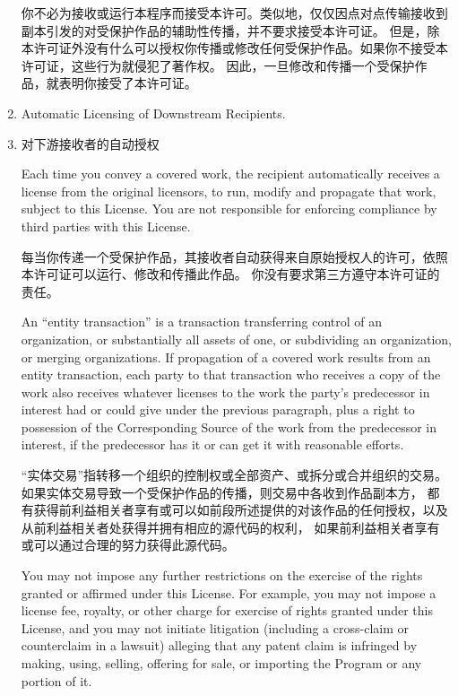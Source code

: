 \documentclass[11pt]{article}
\begin{document}
\begin{enumerate}
        你不必为接收或运行本程序而接受本许可。类似地，仅仅因点对点传输接收到副本引发的对受保护作品的辅助性传播，并不要求接受本许可证。
        但是，除本许可证外没有什么可以授权你传播或修改任何受保护作品。如果你不接受本许可证，这些行为就侵犯了著作权。
        因此，一旦修改和传播一个受保护作品，就表明你接受了本许可证。

  \item Automatic Licensing of Downstream Recipients.
  \item 对下游接收者的自动授权

        Each time you convey a covered work, the recipient automatically
        receives a license from the original licensors, to run, modify and
        propagate that work, subject to this License.  You are not responsible
        for enforcing compliance by third parties with this License.

        每当你传递一个受保护作品，其接收者自动获得来自原始授权人的许可，依照本许可证可以运行、修改和传播此作品。
        你没有要求第三方遵守本许可证的责任。

        An ``entity transaction'' is a transaction transferring control of an
        organization, or substantially all assets of one, or subdividing an
        organization, or merging organizations.  If propagation of a covered
        work results from an entity transaction, each party to that
        transaction who receives a copy of the work also receives whatever
        licenses to the work the party's predecessor in interest had or could
        give under the previous paragraph, plus a right to possession of the
        Corresponding Source of the work from the predecessor in interest, if
        the predecessor has it or can get it with reasonable efforts.

        “实体交易”指转移一个组织的控制权或全部资产、或拆分或合并组织的交易。如果实体交易导致一个受保护作品的传播，则交易中各收到作品副本方，
        都有获得前利益相关者享有或可以如前段所述提供的对该作品的任何授权，以及从前利益相关者处获得并拥有相应的源代码的权利，
        如果前利益相关者享有或可以通过合理的努力获得此源代码。

        You may not impose any further restrictions on the exercise of the
        rights granted or affirmed under this License.  For example, you may
        not impose a license fee, royalty, or other charge for exercise of
        rights granted under this License, and you may not initiate litigation
        (including a cross-claim or counterclaim in a lawsuit) alleging that
        any patent claim is infringed by making, using, selling, offering for
        sale, or importing the Program or any portion of it.


\end{enumerate}
\end{document}
